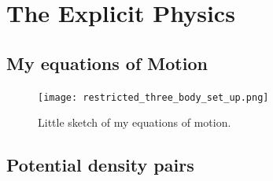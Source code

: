 



\section{The Explicit Physics}
    \subsection*{My equations of Motion} \label{subsec:myEquationsOfMotion}
    \begin{figure}
        \centering
        \texttt{[image: restricted\_three\_body\_set\_up.png]}
        \caption{Little sketch of my equations of motion. }
    \end{figure}

    \subsection{Potential density pairs}

